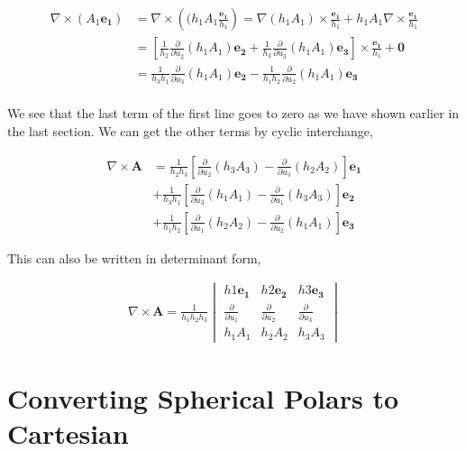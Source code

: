 \documentclass[11pt]{amsart}
\begin{document}
\begin{align*}
  \nabla\times(A_1\mathbf{e_1}) &= \nabla\times\left((h_1A_1\frac{\mathbf{e_1}}{h_1}\right) = \nabla(h_1A_1)\times\frac{\mathbf{e_1}}{h_1}+h_1A_1\nabla\times\frac{\mathbf{e_1}}{h_1} \\
                                &= \left[\frac{1}{h_2}\frac{\partial}{\partial u_2}(h_1A_1)\mathbf{e_2}+\frac{1}{h_3}\frac{\partial}{\partial u_3}(h_1A_1)\mathbf{e_3}\right]\times\frac{\mathbf{e_1}}{h_1} + \mathbf{0} \\
                                &= \frac{1}{h_3h_1}\frac{\partial}{\partial u_3}(h_1A_1)\mathbf{e_2} - \frac{1}{h_1h_2}\frac{\partial}{\partial u_2}(h_1A_1)\mathbf{e_3} \\
\end{align*}

We see that the last term of the first line goes to zero as we have shown earlier in the last section. We can get the other terms by cyclic interchange,

\begin{align*}
  \nabla\times\mathbf{A}&=\frac{1}{h_2h_3}\left[\frac{\partial}{\partial u_2}(h_3A_3)-\frac{\partial}{\partial u_3}(h_2A_2)\right]\mathbf{e_1} \\
                        &+\frac{1}{h_3h_1}\left[\frac{\partial}{\partial u_3}(h_1A_1)-\frac{\partial}{\partial u_1}(h_3A_3)\right]\mathbf{e_2} \\
                        &+\frac{1}{h_1h_2}\left[\frac{\partial}{\partial u_1}(h_2A_2)-\frac{\partial}{\partial u_2}(h_1A_1)\right]\mathbf{e_3}
\end{align*}

This can also be written in determinant form,

\begin{align*}
  \nabla\times\mathbf{A}=\frac{1}{h_1h_2h_3}
  \begin{vmatrix}
    h1\mathbf{e_1} & h2\mathbf{e_2} & h3\mathbf{e_3} \\
    \frac{\partial}{\partial u_1} & \frac{\partial}{\partial u_2} & \frac{\partial}{\partial u_3} \\
    h_1A_1 & h_2A_2 & h_3A_3
  \end{vmatrix}
\end{align*}

\section{Converting Spherical Polars to Cartesian}
\end{document}
